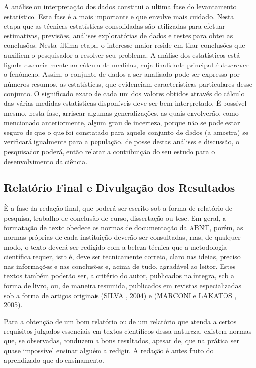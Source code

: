 \inic A análise ou interpretação dos dados constitui a ultima fase do levantamento estatístico. Esta fase é a mais importante e que
envolve mais cuidado. Nesta etapa que as técnicas estatísticas
consolidadas são utilizadas para efetuar estimativas, previsões,
análises exploratórias de dados e testes para obter as conclusões.
Nesta última etapa, o interesse maior reside em tirar conclusões
que auxiliem o pesquisador a resolver seu problema. A análise dos
estatísticos está ligada essencialmente ao cálculo de medidas,
cuja finalidade principal é descrever o fenômeno. Assim, o
conjunto de dados a ser analisado pode ser expresso por
números-resumos, as estatísticas, que evidenciam características
particulares desse conjunto. O significado exato de cada um dos
valores obtidos através do cálculo das várias medidas estatísticas
disponíveis deve ser bem interpretado. É possível mesmo, nesta
fase, arriscar algumas generalizações, as quais envolverão, como
mencionado anteriormente, algum grau de incerteza, porque não se
pode estar seguro de que o que foi constatado para aquele conjunto
de dados (a amostra) se verificará igualmente para a população. de posse destas análises e discussão, o pesquisador poderá, então relatar a contribuição do seu estudo para o desenvolvimento da ciência.



\subsection{Relatório Final e Divulgação dos Resultados}

\inic È a fase da redação final, que poderá ser escrito sob a
forma de relatório de pesquisa, trabalho de conclusão de curso,
dissertação ou tese. Em geral, a formatação de texto obedece as
normas de documentação da ABNT, porém, as normas próprias de cada
instituição deverão ser consultadas, mas, de qualquer modo, o
texto deverá ser redigido com a beleza técnica que a metodologia
científica requer, isto é, deve ser tecnicamente correto, claro
nas ideias, preciso nas informações e nas conclusões e, acima de
tudo, agradável ao leitor. Estes textos também poderão ser, a
critério do autor, publicados na íntegra, sob a forma de livro,
ou, de maneira resumida, publicados em revistas especializadas sob
a forma de artigos originais (SILVA , 2004) e (MARCONI e LAKATOS , 2005).\vskip0.3cm

\inic Para a obtenção de um bom relatório ou de um relatório que atenda a certos requisitos julgados essenciais em textos científicos dessa natureza, existem normas que, se observadas, conduzem a bons resultados, apesar de, que na prática ser quase impossível ensinar alguém a redigir. A redação é antes fruto do aprendizado que do ensinamento.      




